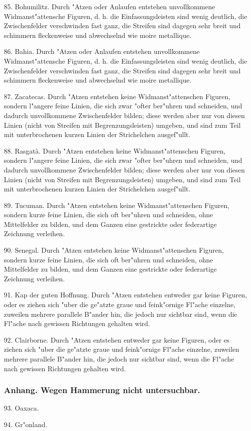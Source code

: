 \documentclass[a4paper, 11pt, oneside, polutonikogreek, german]{article}
\begin{document}
85. Bohumilitz. Durch "Atzen oder Anlaufen entstehen unvollkommene Widmanst"attensche Figuren, d. h. die Einfassungsleisten sind wenig deutlich, die Zwischenfelder verschwinden fast ganz, die Streifen sind dagegen sehr breit und schimmern fleckenweise und abwechselnd wie moire metallique.

86. Bahia. Durch "Atzen oder Anlaufen entstehen unvollkommene Widmanst"attensche Figuren, d. h. die Einfassungsleisten sind wenig deutlich, die Zwischenfelder verschwinden fast ganz, die Streifen sind dagegen sehr breit und schimmern fleckenweise und abwechselnd wie moire metallique.

87. Zacatecas. Durch "Atzen entstehen keine Widmanst"attenschen Figuren, sondern l"angere feine Linien, die sich zwar "ofter ber"uhren und schneiden, und dadurch unvollkommene Zwischenfelder bilden; diese werden aber nur von diesen Linien (nicht von Streifen mit Begrenzungsleisten) umgeben, und sind zum Teil mit unterbrochenen kurzen Linien der Strichelchen ausgef"ullt.

88. Rasgatà. Durch "Atzen entstehen keine Widmanst"attenschen Figuren, sondern l"angere feine Linien, die sich zwar "ofter ber"uhren und schneiden, und dadurch unvollkommene Zwischenfelder bilden; diese werden aber nur von diesen Linien (nicht von Streifen mit Begrenzungsleisten) umgeben, und sind zum Teil mit unterbrochenen kurzen Linien der Strichelchen ausgef"ullt.

89. Tucuman. Durch "Atzen entstehen keine Widmanst"attenschen Figuren, sondern kurze feine Linien, die sich oft ber"uhren und schneiden, ohne Mittelfelder zu bilden, und dem Ganzen eine gestrickte oder federartige Zeichnung verleihen.

90. Senegal. Durch "Atzen entstehen keine Widmanst"attenschen Figuren, sondern kurze feine Linien, die sich oft ber"uhren und schneiden, ohne Mittelfelder zu bilden, und dem Ganzen eine gestrickte oder federartige Zeichnung verleihen.

91. Kap der guten Hoffnung. Durch "Atzen entstehen entweder gar keine Figuren, oder es ziehen sich "uber die ge"atzte graue und feink"ornige Fl"ache einzelne, zuweilen mehrere parallele B"ander hin, die jedoch nur sichtbar sind, wenn die Fl"ache nach gewissen Richtungen gehalten wird.

92. Clairborne. Durch "Atzen entstehen entweder gar keine Figuren, oder es ziehen sich "uber die ge"atzte graue und feink"ornige Fl"ache einzelne, zuweilen mehrere parallele B"ander hin, die jedoch nur sichtbar sind, wenn die Fl"ache nach gewissen Richtungen gehalten wird.

\subsubsection{Anhang. Wegen Hammerung nicht untersuchbar.}
\hspace*{6mm}93. Oaxaca.

94. Gr"onland.
\clearpage
\end{document}
